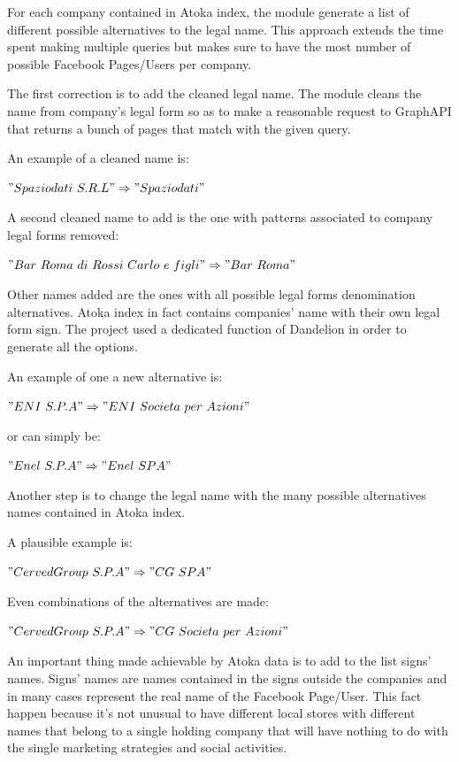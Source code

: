 For each company contained in Atoka index, the module generate a list of different possible alternatives to the legal name. This approach extends the time spent making multiple queries but makes sure to have the most number of possible Facebook Pages/Users per company. 

The first correction is to add the cleaned legal name. The  module cleans the name from company's legal form so as to make a reasonable request to GraphAPI that returns a bunch of pages that match with the given query.

An example of a cleaned name is: 


\vspace*{\fill}
$ "Spaziodati\ S.R.L" \Rightarrow "Spaziodati" $
\vspace*{\fill}



A second cleaned name to add is the one with patterns associated to company legal forms removed:


\vspace*{\fill}
$ "Bar\ Roma\ di\ Rossi\ Carlo\ e\ figli" \Rightarrow "Bar\ Roma"$
\vspace*{\fill}



Other names added are the ones with all possible legal forms denomination alternatives. Atoka index in fact contains companies' name with their own legal form sign. The project used a dedicated function of Dandelion in order to generate all the options.

An example of one a new alternative is:

$ "ENI\ S.P.A" \Rightarrow "ENI\ Societa\ per\ Azioni" $

or can simply be:

$ "Enel\ S.P.A" \Rightarrow "Enel\ SPA" $

Another step is to change the legal name with the many possible alternatives names contained in Atoka index.

A plausible example is:

$ "CervedGroup\ S.P.A" \Rightarrow "CG\ SPA" $

Even combinations of the alternatives are made:

$ "CervedGroup\ S.P.A" \Rightarrow "CG\ Societa\ per\ Azioni" $

An important thing made achievable by Atoka data is to add to the list signs' names. Signs' names are names contained in the signs outside the companies and in many cases represent the real name of the Facebook Page/User. This fact happen because it's not unusual to have different local stores with different names that belong to a single holding company that will have nothing to do with the single marketing strategies and social activities.

